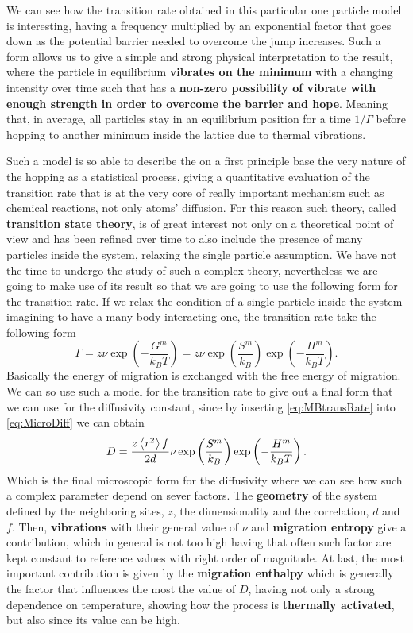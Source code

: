 \noindent
We can see how the transition rate obtained in this particular one particle model is interesting, having a frequency multiplied by an exponential factor that goes down as the potential barrier needed to overcome the jump increases. Such a form allows us to give a simple and strong physical interpretation to the result, where the particle in equilibrium \textbf{vibrates on the minimum} with a changing intensity over time such that has a \textbf{non-zero possibility of vibrate with enough strength in order to overcome the barrier and hope}. Meaning that, in average, all particles stay in an equilibrium position for a time $1/\Gamma$ before hopping to another minimum inside the lattice due to thermal vibrations.

Such a model is so able to describe the on a first principle base the very nature of the hopping as a statistical process, giving a quantitative evaluation of the transition rate that is at the very core of really important mechanism such as chemical reactions, not only atoms' diffusion. For this reason such theory, called \textbf{transition state theory}, is of great interest not only on a theoretical point of view and has been refined over time to also include the presence of many particles inside the system, relaxing the single particle assumption. We have not the time to undergo the study of such a complex theory, nevertheless we are going to make use of its result so that we are going to use the following form for the transition rate.
{
    If we relax the condition of a single particle inside the system imagining to have a many-body interacting one, the transition rate take the following form
    \begin{equation}
        \label{eq:MBtransRate}
        \Gamma = z\nu\exp\left( -\frac{G^m}{k_BT} \right) = z\nu\exp\left( \frac{S^m}{k_B} \right)\exp\left( -\frac{H^m}{k_BT} \right).
    \end{equation}
} 
\noindent
Basically the energy of migration is exchanged with the free energy of migration. We can so use such a model for the transition rate to give out a final form that we can use for the diffusivity constant, since by inserting \eqref{eq:MBtransRate} into \eqref{eq:MicroDiff} we can obtain
\begin{equation}
    D = \frac{z\left\langle r^2 \right\rangle f}{2d}\nu\exp\left( \frac{S^m}{k_B} \right)\exp\left( -\frac{H^m}{k_BT} \right).
\end{equation}
Which is the final microscopic form for the diffusivity where we can see how such a complex parameter depend on sever factors. The \textbf{geometry} of the system defined by the neighboring sites, $z$, the dimensionality and the correlation, $d$ and $f$. Then, \textbf{vibrations} with their general value of $\nu$ and \textbf{migration entropy} give a contribution, which in general is not too high having that often such factor are kept constant to reference values with right order of magnitude. At last, the most important contribution is given by the \textbf{migration enthalpy} which is generally the factor that influences the most the value of $D$, having not only a strong dependence on temperature, showing how the process is \textbf{thermally activated}, but also since its value can be high.

